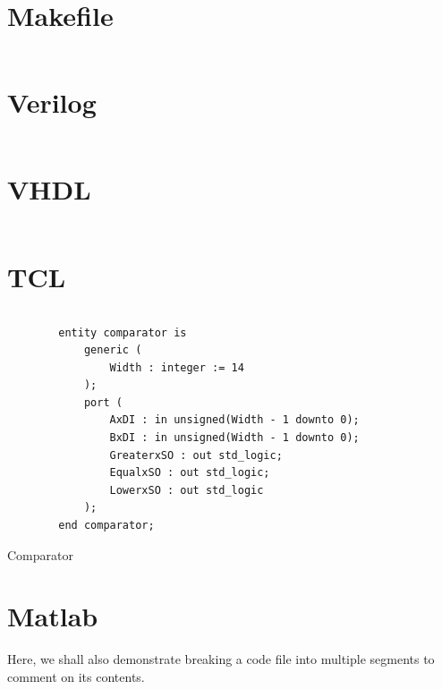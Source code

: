 \documentclass[a4paper,oneside]{alpenthesis/alpenthesis}
\begin{document}
\section{Makefile}
\begin{tcolorbox}[
        breakable,
        title={
            \refstepcounter{listing}
            Listing \thelisting: Makefile Code
            \label{lst:makefile}
            \addcontentsline{lol}{listing}{\protect\numberline{\thelisting}Makefile Code}
        }
    ]
    \inputminted{makefile}{code/Makefile}
\end{tcolorbox}

\section{Verilog}
\begin{tcolorbox}[
        breakable,
        width=1.2\textwidth,
        title={
            \refstepcounter{listing}
            Listing \thelisting: Verilog Code
            \label{lst:makefile}
            \addcontentsline{lol}{listing}{\protect\numberline{\thelisting}Verilog Code}
        }
    ]
\inputminted{verilog}{./code/axi_axis_reader.v}
\end{tcolorbox}

\section{VHDL}
\inputminted{vhdl}{./code/comparator.vhd}

\section{TCL}
\inputminted{tcl}{./code/create_cores.tcl}

\begin{listing}
    \begin{verbatim}
        entity comparator is
            generic (
                Width : integer := 14
            );
            port (
                AxDI : in unsigned(Width - 1 downto 0);
                BxDI : in unsigned(Width - 1 downto 0);
                GreaterxSO : out std_logic;
                EqualxSO : out std_logic;
                LowerxSO : out std_logic
            );
        end comparator;
    \end{verbatim}
    \caption{Comparator}
    \label{lst:vhdl:comparator}
\end{listing}

\section{Matlab}
Here, we shall also demonstrate breaking a code file into multiple segments
to comment on its contents.
\end{document}
